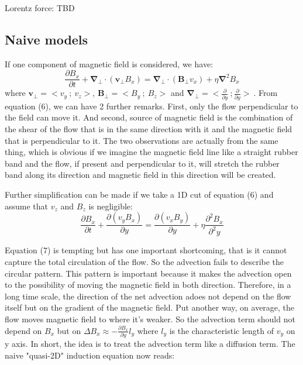 \documentclass[11pt]{article}
\begin{document}
Lorentz force: TBD

\subsection{Naive models}

If one component of magnetic field is  considered, we have:
\begin{equation}
\frac{\partial B_x}{\partial t} + \bm{\nabla_{\bot} \cdot}(\bm{v}_{\bot}B_x)   = \bm{\nabla_{\bot} \cdot}(\bm{B}_{\bot}v_x) + \eta \bm{{\nabla}} ^2 B_x
\end{equation}
where $\bm{v}_{\bot} = <v_y \ ; \ v_z>$, $ \bm{B}_{\bot} = <B_y \ ; \ B_z>$ and $\bm{\nabla_{\bot}}= <\frac{\partial}{\partial y} \ ;  \frac{\partial}{\partial y} > \ $. From equation (6), we can have 2 further remarks. First, only the flow perpendicular to the field can move it. And second, source of magnetic field is the combination of the shear of the flow that is in the same direction with it and the magnetic field that is perpendicular to it. The two observations are actually from the same thing, which is obvious if we imagine the magnetic field line like a straight rubber band and the flow, if present and perpendicular to it, will stretch the rubber band along its direction and magnetic field in this direction will be created.

Further simplification can be made if we take a 1D cut of equation (6) and assume that $v_z $ and $B_z$ is negligible: 
\begin{equation}
\frac{\partial B_x}{\partial t} +  \frac{\partial({v}_y B_x)}{\partial y}
  = \frac{\partial(v_x B_y)}{\partial y}+ \eta{\frac{\partial^2 B_x}{\partial^2 y}}
\end{equation}

Equation (7) is tempting but has one important shortcoming, that is it cannot capture the total circulation of the flow. So the advection fails to describe the circular pattern. This pattern is important because it makes the advection open to the possibility of moving the magnetic field in both direction. Therefore, in a long time scale, the direction of the net advection adoes not depend on the flow itself but on the gradient of the magnetic field. Put another way, on average, the flow moves magnetic field to where it's weaker. So the advection term should not depend on $B_x$ but on $\Delta B_x \approx -\frac{\partial B_x}{\partial y} l_y $ where $l_y$ is the characteristic length of $v_y$ on y axis. In short, the idea is to treat the advection term like a diffusion term. The naive "quasi-2D" induction equation now reads:
\end{document}
